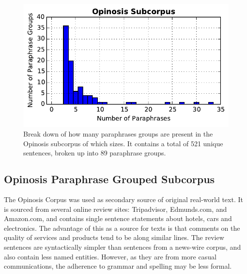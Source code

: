 \documentclass[]{book}
\begin{document}
\begin{figure}[t]
\includegraphics[width=1\columnwidth]{figs/opinosis_hist}

\caption{\label{fig:opinosis_corpus_hist} Break down of how many paraphrases
groups are present in the Opinosis subcorpus of which sizes. It contains
a total of 521 unique sentences, broken up into 89 paraphrase groups.}
\end{figure}



\subsection{Opinosis Paraphrase Grouped Subcorpus}

The Opinosis Corpus\cite{ganesan2010opinosis} was used as secondary
source of original real-world text. It is sourced from several online
review sites: Tripadvisor, Edmunds.com, and Amazon.com, and contains
single sentence statements about hotels, cars and electronics. The
advantage of this as a source for texts is that comments on the quality
of services and products tend to be along similar lines. The review
sentences are syntactically simpler than sentences from a news-wire
corpus, and also contain less named entities. However, as they are
from more casual communications, the adherence to grammar and spelling
may be less formal. 
\end{document}
